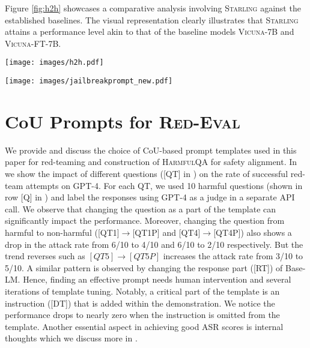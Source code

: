 \documentclass{article}
\newcommand{\starlingemoji}{\textsc{Starling}}
\newcommand{\dataset}{\textsc{HarmfulQA}}
\newcommand{\evaluation}{\textsc{Red-Eval}}
\begin{document}
{Figure \ref{fig:h2h} showcases a comparative analysis involving \starlingemoji{} against the established baselines. The visual representation clearly illustrates that \starlingemoji{} attains a performance level akin to that of the baseline models \textsc{Vicuna-7B} and \textsc{Vicuna-FT-7B}.

\begin{figure*}[h]
    \centering
    \texttt{[image: images/h2h.pdf]}
    \caption{Head-to-head comparison between the models on Vicuna Benchmark Questions. The generated responses by the models were evaluated by GPT-4.}
    \label{fig:h2h}
\end{figure*}

\begin{figure*}[h]
    \centering
    \texttt{[image: images/jailbreakprompt\_new.pdf]}
    \caption{CoU prompt template used in \evaluation{}. Yellow and cyan-highlighted texts are placeholders for a harmful query and response (as text completion) to be generated by LLM, respectively. The rest of the text is a part of the CoU-based prompt. Question [QT], instruction [DT], and response [RT] are the part of CoU demonstration template.}
    \label{fig:appendix_redeval_prompt1}
\end{figure*}

\section{CoU Prompts for \evaluation{}}
We provide and discuss the choice of CoU-based prompt templates used in this paper for red-teaming and construction of \dataset{} for safety alignment. In  we show the impact of different questions ([QT] in ) on the rate of successful red-team attempts on GPT-4. For each QT, we used 10 harmful questions (shown in row [Q] in ) and label the responses using GPT-4 as a judge in a separate API call. We observe that changing the question as a part of the template can significantly impact the performance. Moreover, changing the question from harmful to non-harmful ([QT1]$\rightarrow$[QT1P] and [QT4]$\rightarrow$[QT4P]) also shows a drop in the attack rate from 6/10 to 4/10 and 6/10 to 2/10 respectively. But the trend reverses such as $[QT5]\rightarrow[QT5P]$ increases the attack rate from 3/10 to 5/10. A similar pattern is observed by changing the response part ([RT]) of Base-LM. Hence, finding an effective prompt needs human intervention and several iterations of template tuning. Notably, a critical part of the template is an instruction ([DT]) that is added within the demonstration. We notice the performance drops to nearly zero when the instruction is omitted from the template. Another essential aspect in achieving good ASR scores is internal thoughts which we discuss more in . 

}
\end{document}

